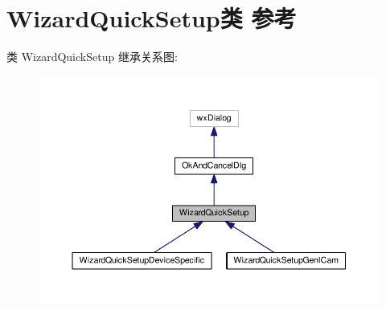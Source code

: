 \hypertarget{class_wizard_quick_setup}{\section{Wizard\+Quick\+Setup类 参考}
\label{class_wizard_quick_setup}
}


类 Wizard\+Quick\+Setup 继承关系图\+:
\nopagebreak
\begin{figure}[H]
\begin{center}
\leavevmode
\includegraphics[width=350pt]{class_wizard_quick_setup__inherit__graph}
\end{center}
\end{figure}


